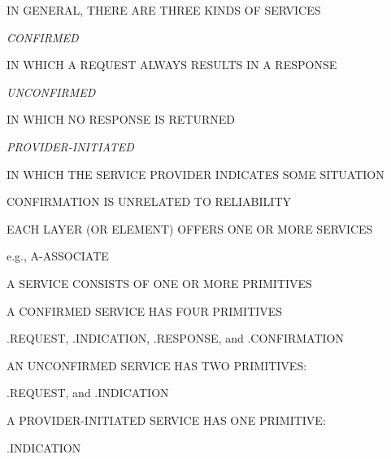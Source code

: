 \begin{bwslide}

\begin{nrtc}
\item	IN GENERAL, THERE ARE THREE KINDS OF SERVICES
    \begin{nrtc}
    \item	\emph{CONFIRMED}
	\begin{nrtc}
	\item	IN WHICH A REQUEST ALWAYS RESULTS IN A RESPONSE
	\end{nrtc}

    \item	\emph{UNCONFIRMED}
	\begin{nrtc}
	\item	IN WHICH NO RESPONSE IS RETURNED
	\end{nrtc}

    \item	\emph{PROVIDER-INITIATED}
	\begin{nrtc}
	\item	IN WHICH THE SERVICE PROVIDER INDICATES SOME SITUATION
	\end{nrtc}
    \end{nrtc}

\item	CONFIRMATION IS UNRELATED TO RELIABILITY
\end{nrtc}
\end{bwslide}


\begin{bwslide}

\begin{nrtc}
\item	EACH LAYER (OR ELEMENT) OFFERS ONE OR MORE SERVICES
    \begin{nrtc}
    \item	e.g., A-ASSOCIATE
    \end{nrtc}

\item	A SERVICE CONSISTS OF ONE OR MORE PRIMITIVES

\item	A CONFIRMED SERVICE HAS FOUR PRIMITIVES
    \begin{nrtc}
    \item	.REQUEST, .INDICATION, .RESPONSE, and .CONFIRMATION
    \end{nrtc}

\item	AN UNCONFIRMED SERVICE HAS TWO PRIMITIVES:
    \begin{nrtc}
    \item	.REQUEST,  and .INDICATION
    \end{nrtc}

\item	A PROVIDER-INITIATED SERVICE HAS ONE PRIMITIVE:
    \begin{nrtc}
    \item	.INDICATION
    \end{nrtc}
\end{nrtc}
\end{bwslide}


